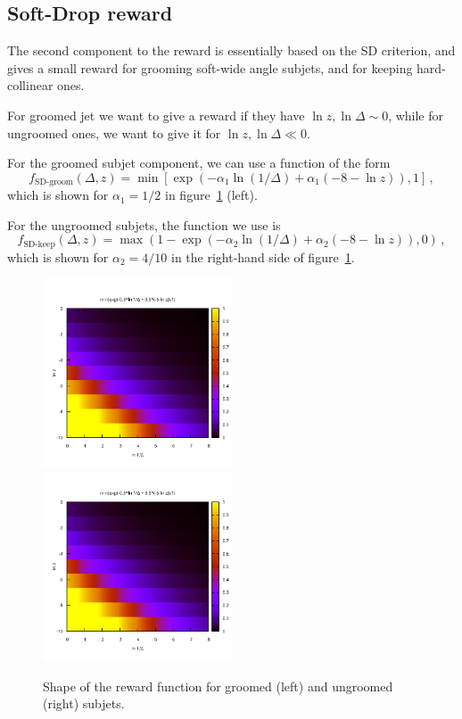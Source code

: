 \documentclass[12pt,twoside]{article}
\begin{document}
\subsection{Soft-Drop reward}
The second component to the reward is essentially based on the SD
criterion, and gives a small reward for grooming soft-wide angle
subjets, and for keeping hard-collinear ones.

For groomed jet we want to give a reward if they have
$\ln z,\ln\Delta\sim 0$, while for ungroomed ones, we want to give it
for $\ln z,\ln\Delta \ll 0$.

For the groomed subjet component, we can use a function of the form
\begin{equation}
  \label{eq:groom-rew}
  f_{\text{SD-groom}}(\Delta, z) =
  \min[\exp(-\alpha_1 \ln(1/\Delta) + \alpha_1(-8-\ln z)),1]\,,
\end{equation}
which is shown for $\alpha_1=1/2$ in figure~\ref{fig:SD-reward-shape}
(left).

For the ungroomed subjets, the function we use is
\begin{equation}
  \label{eq:keep-rew}
  f_{\text{SD-keep}}(\Delta, z) =
  \max(1 - \exp(-\alpha_2 \ln(1/\Delta) + \alpha_2(-8-\ln z)),0)\,,
\end{equation}
which is shown for $\alpha_2=4/10$ in the right-hand side of
figure~\ref{fig:SD-reward-shape}.

\begin{figure}
  \centering
  \includegraphics[width=0.5\textwidth,page=1]{SD-reward-test}%
  \includegraphics[width=0.5\textwidth,page=2]{SD-reward-test}%
  \caption{Shape of the reward function for groomed (left) and ungroomed (right) subjets.}
  \label{fig:SD-reward-shape}
\end{figure}
\end{document}
